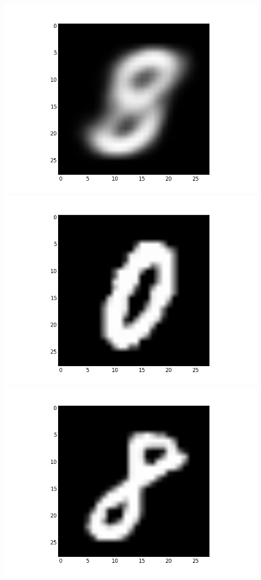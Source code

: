 \documentclass[submit]{harvardml}
\begin{document}
\begin{figure}[ht]
    \centering
    \includegraphics[scale=0.20]{K10-mean-6}
    \includegraphics[scale=0.20]{K10-representative-6-0}
    \includegraphics[scale=0.20]{K10-representative-6-1}

\end{figure}
\end{document}
